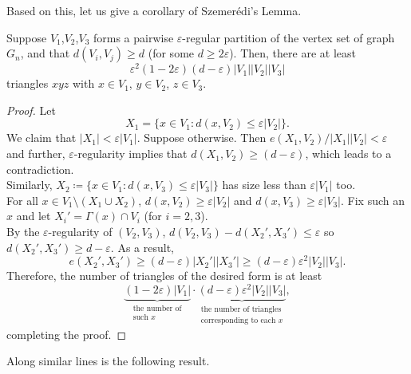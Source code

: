 			Based on this, let us give a corollary of Szemer\'{e}di's Lemma.

			\begin{ftheo}
				\label{theo: triangle counting lemma}
				Suppose $V_1$,$V_2$,$V_3$ forms a pairwise $\varepsilon$-regular partition of the vertex set of graph $G_n$, and that $d(V_i,V_j) \ge d$ (for some $d\ge 2\varepsilon$). Then, there are at least 
				\[ \varepsilon^2(1-2\varepsilon)(d-\varepsilon)|V_1||V_2||V_3| \]
				triangles $xyz$ with $x\in V_1$, $y\in V_2$, $z\in V_3$. 
			\end{ftheo}
			\begin{proof}
				Let
				\[ X_1 = \{x\in V_1 : d(x,V_2) \le \varepsilon |V_2|\}. \]
				We claim that $|X_1| < \varepsilon|V_1|$. Suppose otherwise. Then $e(X_1,V_2) / |X_1||V_2| < \varepsilon$ and further, $\varepsilon$-regularity implies that $d(X_1,V_2) \ge (d-\varepsilon)$, which leads to a contradiction.\\
				Similarly, $X_2 \coloneqq \{x\in V_1 : d(x,V_3) \le \varepsilon|V_3|\}$ has size less than $\varepsilon|V_1|$ too.\\
				For all $x\in V_1 \setminus (X_1 \cup X_2)$, $d(x,V_2) \ge \varepsilon|V_2|$ and $d(x,V_3) \ge \varepsilon|V_3|$. Fix such an $x$ and let $X_i' = \Gamma(x)\cap V_i$ (for $i=2,3$).\\
				By the $\varepsilon$-regularity of $(V_2,V_3)$, $d(V_2,V_3) - d(X_2',X_3') \le \varepsilon$ so $d(X_2',X_3') \ge d-\varepsilon$. As a result,
				\[ e(X_2',X_3') \ge (d-\varepsilon)|X_2'||X_3'| \ge (d-\varepsilon)\varepsilon^2|V_2||V_3|. \]
				Therefore, the number of triangles of the desired form is at least
				\[ \underbrace{(1-2\varepsilon)|V_1|}_{\substack{\text{the number of} \\ \text{such $x$}}}\cdot \underbrace{(d-\varepsilon)\varepsilon^2|V_2||V_3|}_{\substack{\text{the number of triangles} \\ \text{corresponding to each $x$}}}, \]
				completing the proof.
			\end{proof}

			Along similar lines is the following result.

